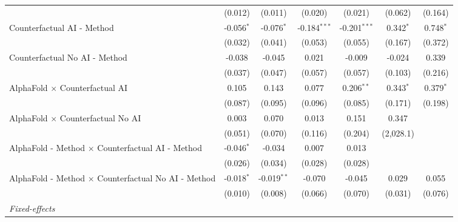 \begin{tabular}{lcccccc}
                                                              & (0.012)      & (0.011)       & (0.020)        & (0.021)        & (0.062)     & (0.164)\\   
   Counterfactual AI - Method                                 & -0.056$^{*}$ & -0.076$^{*}$  & -0.184$^{***}$ & -0.201$^{***}$ & 0.342$^{*}$ & 0.748$^{*}$\\   
                                                              & (0.032)      & (0.041)       & (0.053)        & (0.055)        & (0.167)     & (0.372)\\   
   Counterfactual No AI - Method                              & -0.038       & -0.045        & 0.021          & -0.009         & -0.024      & 0.339\\   
                                                              & (0.037)      & (0.047)       & (0.057)        & (0.057)        & (0.103)     & (0.216)\\   
   AlphaFold $\times$ Counterfactual AI                       & 0.105        & 0.143         & 0.077          & 0.206$^{**}$   & 0.343$^{*}$ & 0.379$^{*}$\\   
                                                              & (0.087)      & (0.095)       & (0.096)        & (0.085)        & (0.171)     & (0.198)\\   
   AlphaFold $\times$ Counterfactual No AI                    & 0.003        & 0.070         & 0.013          & 0.151          & 0.347       &   \\   
                                                              & (0.051)      & (0.070)       & (0.116)        & (0.204)        & (2,028.1)   &   \\   
   AlphaFold - Method $\times$ Counterfactual AI - Method     & -0.046$^{*}$ & -0.034        & 0.007          & 0.013          &             &   \\   
                                                              & (0.026)      & (0.034)       & (0.028)        & (0.028)        &             &   \\   
   AlphaFold - Method $\times$ Counterfactual No AI - Method  & -0.018$^{*}$ & -0.019$^{**}$ & -0.070         & -0.045         & 0.029       & 0.055\\   
                                                              & (0.010)      & (0.008)       & (0.066)        & (0.070)        & (0.031)     & (0.076)\\   
   \midrule
   \emph{Fixed-effects}\\

\end{tabular}
